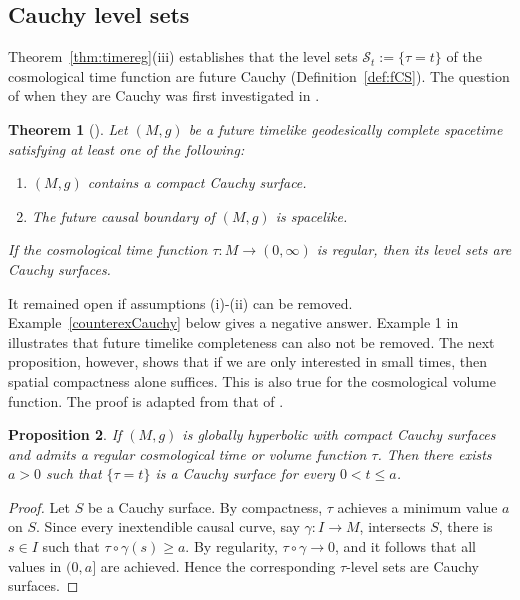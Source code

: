\documentclass[a4paper,11pt]{amsart}
\newtheorem{theorem}{{Theorem}}[section]
\newtheorem{proposition}[theorem]{{Proposition}}%
\newcommand{\CS}{\mathcal{S}}
\begin{document}
\subsection{Cauchy level sets}

Theorem~\ref{thm:timereg}(iii) establishes that the level sets $\CS_t := \{\tau = t\}$ of the cosmological time function are future Cauchy (Definition~\ref{def:fCS}). The question of when they are Cauchy was first investigated in \cite{GaGa25}.

\begin{theorem}[{\cite[Thm.~5]{GaGa25}}] \label{thm:GaGa25}
 Let $(M,g)$ be a future timelike geodesically complete spacetime satisfying at least one of the following:
 \begin{enumerate}
  \item $(M,g)$ contains a compact Cauchy surface.
  \item The future causal boundary of $(M,g)$ is spacelike.
 \end{enumerate}
 If the cosmological time function $\tau \colon M \to (0,\infty)$ is regular, then its level sets are Cauchy surfaces.
\end{theorem}

It remained open if assumptions (i)-(ii) can be removed. Example~\ref{counterexCauchy} below gives a negative answer. Example 1 in \cite{GaGa25} illustrates that future timelike completeness can also not be removed. The next proposition, however, shows that if we are only interested in small times, then spatial compactness alone suffices. This is also true for the cosmological volume function. The proof is adapted from that of \cite[Thm.~4.2]{GaZe}.

\begin{proposition} \label{prop:Cauchy}
 If $(M,g)$ is globally hyperbolic with compact Cauchy surfaces and admits a regular cosmological time or volume function $\tau$. Then there exists $a > 0$ such that $\{\tau = t\}$ is a Cauchy surface for every $0 < t \leq a$.
\end{proposition}

\begin{proof}
 Let $S$ be a Cauchy surface. By compactness, $\tau$ achieves a minimum value $a$ on $S$. Since every inextendible causal curve, say $\gamma \colon I \to M$, intersects $S$, there is $s \in I$ such that $\tau \circ \gamma(s) \geq a$. By regularity, $\tau \circ \gamma \to 0$, and it follows that all values in $(0,a]$ are achieved. Hence the corresponding $\tau$-level sets are Cauchy surfaces.
\end{proof}
\end{document}
